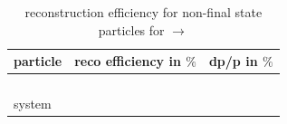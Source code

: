 	\begin{table}
		\centering
		\caption{reconstruction efficiency for non-final state particles for \pbarpSystem $\rightarrow$ \excitedcascade \anticascade}
		\label{tab:non-finalstate_efficiency}
		
		\begin{tabular}{lcc}
		
			\hline
			particle & reco efficiency in $\%$ & dp/p in $\%$ \\\hline
			\hline
			\lam & & \\
			\alam & & \\
			\anticascade & & \\
			\excitedcascade & & \\
			\anticascade \cascade system & & \\\hline
			 	
		\end{tabular}
	\end{table}
	